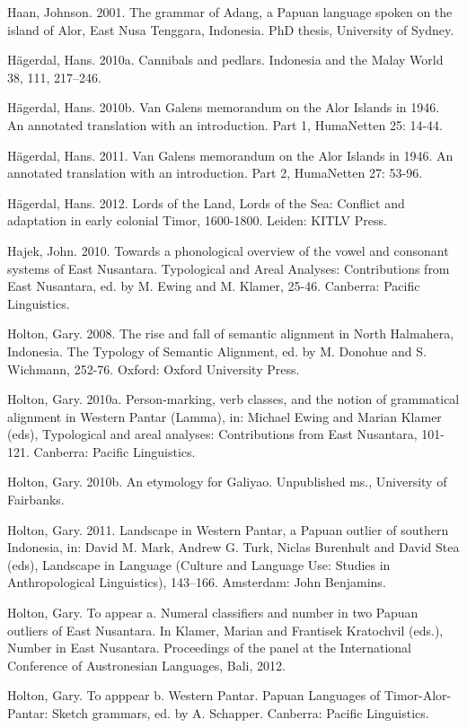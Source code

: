 Haan, Johnson. 2001. The grammar of Adang, a Papuan language spoken on the island of Alor, East Nusa Tenggara, Indonesia. PhD thesis, University of Sydney.

H\"agerdal, Hans. 2010a. Cannibals and pedlars. Indonesia and the Malay World 38, 111, 217--246.

H\"agerdal, Hans. 2010b. Van Galens memorandum on the Alor Islands in 1946. An annotated translation with an introduction. Part 1, HumaNetten 25: 14-44.

H\"agerdal, Hans. 2011. Van Galens memorandum on the Alor Islands in 1946. An annotated translation with an introduction. Part 2, HumaNetten 27: 53-96.

H\"agerdal, Hans. 2012. Lords of the Land, Lords of the Sea: Conflict and adaptation in early colonial Timor, 1600-1800. Leiden: KITLV Press.

Hajek, John. 2010. Towards a phonological overview of the vowel and consonant systems of East Nusantara. Typological and Areal Analyses: Contributions from East Nusantara, ed. by M. Ewing and M. Klamer, 25-46. Canberra: Pacific Linguistics.

Holton, Gary. 2008. The rise and fall of semantic alignment in North Halmahera, Indonesia. The Typology of Semantic Alignment, ed. by M. Donohue and S. Wichmann, 252-76. Oxford: Oxford University Press.

Holton, Gary. 2010a. Person-marking, verb classes, and the notion of grammatical alignment in Western Pantar (Lamma), in: Michael Ewing and Marian Klamer (eds), Typological and areal analyses: Contributions from East Nusantara, 101-121. Canberra: Pacific Linguistics.

Holton, Gary. 2010b. An etymology for Galiyao. Unpublished ms., University of Fairbanks. 

Holton, Gary. 2011. Landscape in Western Pantar, a Papuan outlier of southern Indonesia, in: David M. Mark, Andrew G. Turk, Niclas Burenhult and David Stea (eds), Landscape in Language (Culture and Language Use: Studies in Anthropological Linguistics), 143--166. Amsterdam: John Benjamins.

Holton, Gary. To appear a. Numeral classifiers and number in two Papuan outliers of East Nusantara. In Klamer, Marian and Frantisek Kratochvil (eds.), Number in East Nusantara. Proceedings of the panel at the International Conference of Austronesian Languages, Bali, 2012.

Holton, Gary. To apppear b. Western Pantar. Papuan Languages of Timor-Alor-Pantar: Sketch grammars, ed. by A. Schapper. Canberra: Pacific Linguistics.

